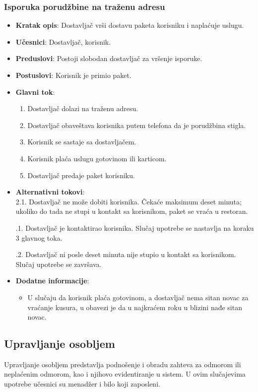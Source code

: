  \subsubsection{Isporuka porudžbine na traženu adresu}
 \begin{itemize}
    \item \textbf{Kratak opis}: Dostavljač vrši dostavu paketa korisniku i naplaćuje uslugu.
    \item \textbf{Učesnici}:
    Dostavljač, korisnik.
    \item \textbf{Preduslovi}:
    Postoji slobodan dostavljač za vršenje isporuke.
    \item \textbf{Postuslovi}:
    Korisnik je primio paket.
    \item \textbf{Glavni tok}:
    \begin{enumerate}
        \item Dostavljač dolazi na traženu adresu.
        \item Dostavljač obaveštava korisnika putem telefona da je porudžbina stigla.
        \item Korisnik se sastaje sa dostavljačem.
        \item Korisnik plaća uslugu gotovinom ili karticom.
        \item Dostavljač predaje paket korisniku.
 \end{enumerate}
    \item \textbf{Alternativni tokovi}:\\
        2.1. Dostavljač ne može dobiti korisnika. Čekaće maksimum deset minuta; ukoliko do tada ne stupi u kontakt sa korisnikom, paket se vraća u restoran. 
        
        .1. Dostavljač je kontaktirao korisnika. Slučaj upotrebe se nastavlja na koraku 3 glavnog toka.
        
        .2. Dostavljač ni posle deset minuta nije stupio u kontakt sa korisnikom. Slučaj upotrebe se završava.
        
    \item \textbf{Dodatne informacije}:
     \begin{itemize}
     \item U slučaju da korisnik plaća gotovinom, a dostavljač nema sitan novac za vraćanje kusura, u obavezi je da u najkraćem roku u blizini nađe sitan novac.
 \end{itemize}
 \end{itemize}
 \newpage
 \subsection{Upravljanje osobljem}
 Upravljanje osobljem predstavlja podno\v senje i obradu zahteva za odmorom ili nepla\'cenim odmorom, kao i njihovo evidentiranje u sistem. U ovim slu\v cajevima upotrebe u\v cesnici su menad\v zer i bilo koji zaposleni.
 
